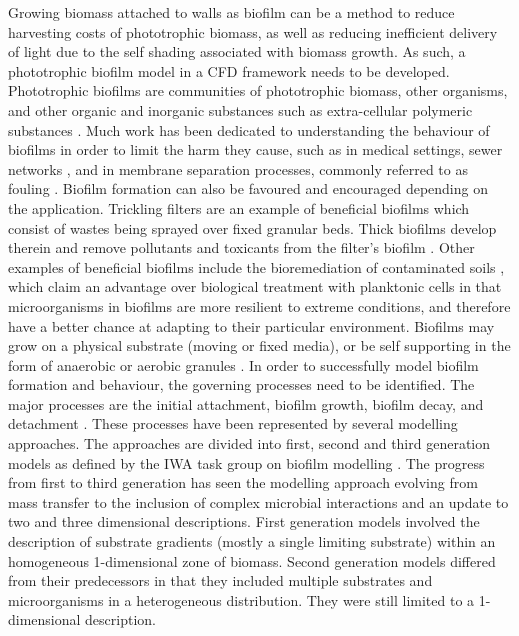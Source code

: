 Growing biomass attached to walls as biofilm can be a method to reduce harvesting costs of phototrophic biomass, as well as reducing inefficient delivery of light due to the self shading associated with biomass growth. As such, a phototrophic biofilm model in a CFD framework needs to be developed. 
\skippingparagraph
Phototrophic biofilms are communities of phototrophic biomass, other organisms, and other organic and inorganic substances such as extra-cellular polymeric substances \cite{vanloosdrecht2002}. 
Much work has been dedicated to understanding the behaviour of biofilms in order to limit the harm they cause, such as in medical settings, sewer networks \cite{pikaar2014}, and in membrane separation processes, commonly referred to as fouling \cite{radaei2018}. Biofilm formation can also be favoured and encouraged depending on the application. 
Trickling filters are an example of beneficial biofilms which consist of wastes being sprayed over fixed granular beds. Thick biofilms develop therein and remove pollutants and toxicants from the filter's biofilm \cite{donlan2002}. Other examples of beneficial biofilms include the bioremediation of contaminated soils \cite{singh2006}, which claim an advantage over biological treatment with planktonic cells in that microorganisms in biofilms are more resilient to extreme conditions, and therefore have a better chance at adapting to their particular environment. Biofilms may grow on a physical substrate (moving or fixed media), or be self supporting in the form of anaerobic or aerobic granules \cite{baeten2019}. 
\skippingparagraph
In order to successfully model biofilm formation and behaviour, the governing processes need to be identified. The major processes are the initial attachment, biofilm growth, biofilm decay, and detachment \cite{alpkvist2007}. 
These processes have been represented by several modelling approaches. The approaches are divided into first, second and third generation models as defined by the IWA task group on biofilm modelling \cite{wanner2006}. 
The progress from first to third generation has seen the modelling approach evolving from mass transfer to the inclusion of complex microbial interactions and an update to two and three dimensional descriptions. First generation models involved the description of substrate gradients (mostly a single limiting substrate) within an homogeneous 1-dimensional zone of biomass. Second generation models differed from their predecessors in that they included multiple substrates and microorganisms in a heterogeneous distribution. They were still limited to a 1-dimensional description. 
